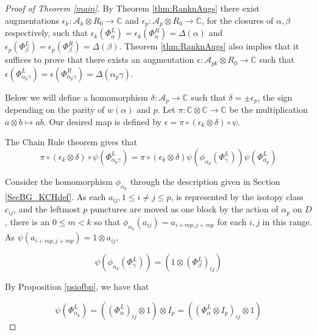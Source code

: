 \documentclass[11pt]{amsart}
\def\C{{\mathbb C}}
\def\A{{\mathcal A}}
\theoremstyle{definition}
\begin{document}
\begin{proof}[Proof of Theorem \ref{main}]
By Theorem \ref{thm:RanknAugs} there exist augmentations $\epsilon_k\colon \A_k\otimes R_0 \rightarrow \C$ and $\epsilon_p\colon \A_p\otimes R_0 \rightarrow \C$, for the closures of $\alpha,\beta$ respectively, such that $\epsilon_k\left(\Phi_\alpha^L\right) = \epsilon_k\left(\Phi_\alpha^R\right) = \Delta(\alpha)$ and $\epsilon_p\left(\Phi_{\beta}^L\right) = \epsilon_p\left(\Phi_{\beta}^R\right) = \Delta(\beta)$. Theorem \ref{thm:RanknAugs} also implies that it suffices to prove that there exists an augmentation $\epsilon\colon \A_{pk}\otimes R_0\rightarrow \C$ such that $\epsilon\left(\Phi_{\alpha_p\gamma}^L\right) = \epsilon\left(\Phi_{\alpha_p\gamma}^R\right) = \Delta(\alpha_p\gamma)$.

Below we will define a homomorphism $\delta\colon\A_p\rightarrow \C$ such that $\delta = \pm \epsilon_p$, the sign depending on the parity of $w(\alpha)$ and $p$. Let $\pi\colon \C\otimes \C \rightarrow \C$ be the multiplication $a\otimes b\mapsto ab$. Our desired map is defined by $\epsilon = \pi\circ(\epsilon_k\otimes\delta)\circ\psi$.

The Chain Rule theorem gives that
\begin{equation}
\pi\circ(\epsilon_k\otimes\delta)\circ\psi\left(\Phi_{\alpha_p\gamma}^L\right) = \pi\circ(\epsilon_k\otimes\delta)\psi\left(\phi_{\alpha_p}\left(\Phi_{\gamma}^L\right)\right)\psi\left(\Phi_{\alpha_p}^L\right)
\label{eqn1MainPf}
\end{equation}

Consider the homomorphism $\phi_{\alpha_p}$ through the description given in Section \ref{SecBG_KCHdef}. As each $a_{ij}, 1\le i\ne j\le p$, is represented by the isotopy class $c_{ij}$, and the leftmost $p$ punctures are moved as one block by the action of $\alpha_p$ on $D$, there is an $0\le m<k$ so that $\phi_{\alpha_p}(a_{ij})=a_{i+mp,j+mp}$ for each $i,j$ in this range. As $\psi(a_{i + mp, j+mp})=1\otimes a_{ij}$,

$$\psi\left(\phi_{\alpha_p}\left(\Phi_{\gamma}^L\right)\right) = \left(1\otimes \left(\Phi_{\beta}^L\right)_{ij}\right)$$

\noindent By Proposition \ref{psiofbp}, we have that 

$$\psi\left(\Phi_{\alpha_p}^L\right) = \left(\left(\Phi_\alpha^L\right)_{ij}\otimes 1\right)\otimes I_p = \left(\left(\Phi_\alpha^L\otimes I_p\right)_{ij}\otimes 1\right)$$


\end{proof}
\end{document}
